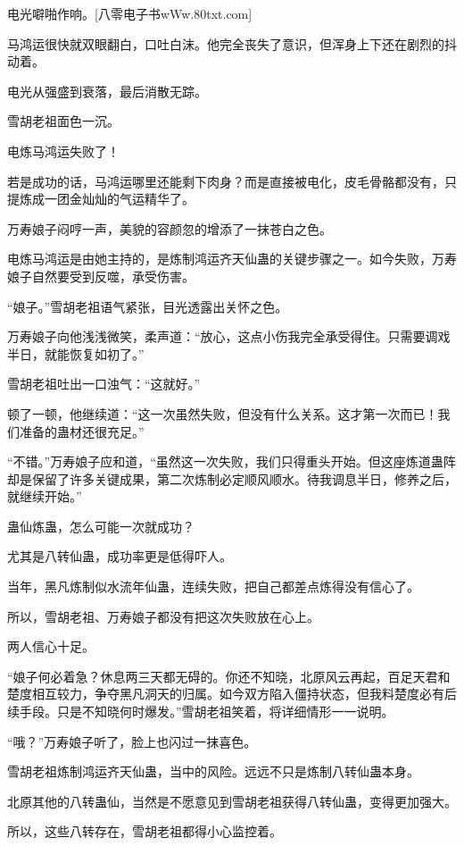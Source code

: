 
\begin{this_body}

电光噼啪作响。[八零电子书wWw.80txt.com]

马鸿运很快就双眼翻白，口吐白沫。他完全丧失了意识，但浑身上下还在剧烈的抖动着。

电光从强盛到衰落，最后消散无踪。

雪胡老祖面色一沉。

电炼马鸿运失败了！

若是成功的话，马鸿运哪里还能剩下肉身？而是直接被电化，皮毛骨骼都没有，只提炼成一团金灿灿的气运精华了。

万寿娘子闷哼一声，美貌的容颜忽的增添了一抹苍白之色。

电炼马鸿运是由她主持的，是炼制鸿运齐天仙蛊的关键步骤之一。如今失败，万寿娘子自然要受到反噬，承受伤害。

“娘子。”雪胡老祖语气紧张，目光透露出关怀之色。

万寿娘子向他浅浅微笑，柔声道：“放心，这点小伤我完全承受得住。只需要调戏半日，就能恢复如初了。”

雪胡老祖吐出一口浊气：“这就好。”

顿了一顿，他继续道：“这一次虽然失败，但没有什么关系。这才第一次而已！我们准备的蛊材还很充足。”

“不错。”万寿娘子应和道，“虽然这一次失败，我们只得重头开始。但这座炼道蛊阵却是保留了许多关键成果，第二次炼制必定顺风顺水。待我调息半日，修养之后，就继续开始。”

蛊仙炼蛊，怎么可能一次就成功？

尤其是八转仙蛊，成功率更是低得吓人。

当年，黑凡炼制似水流年仙蛊，连续失败，把自己都差点炼得没有信心了。

所以，雪胡老祖、万寿娘子都没有把这次失败放在心上。

两人信心十足。

“娘子何必着急？休息两三天都无碍的。你还不知晓，北原风云再起，百足天君和楚度相互较力，争夺黑凡洞天的归属。如今双方陷入僵持状态，但我料楚度必有后续手段。只是不知晓何时爆发。”雪胡老祖笑着，将详细情形一一说明。

“哦？”万寿娘子听了，脸上也闪过一抹喜色。

雪胡老祖炼制鸿运齐天仙蛊，当中的风险。远远不只是炼制八转仙蛊本身。

北原其他的八转蛊仙，当然是不愿意见到雪胡老祖获得八转仙蛊，变得更加强大。

所以，这些八转存在，雪胡老祖都得小心监控着。


\end{this_body}
